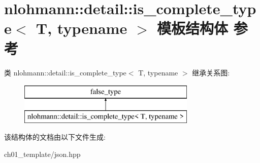 \hypertarget{structnlohmann_1_1detail_1_1is__complete__type}{}\section{nlohmann\+::detail\+::is\+\_\+complete\+\_\+type$<$ T, typename $>$ 模板结构体 参考}
\label{structnlohmann_1_1detail_1_1is__complete__type}
类 nlohmann\+::detail\+::is\+\_\+complete\+\_\+type$<$ T, typename $>$ 继承关系图\+:\begin{figure}[H]
\begin{center}
\leavevmode
\includegraphics[height=2.000000cm]{structnlohmann_1_1detail_1_1is__complete__type}
\end{center}
\end{figure}


该结构体的文档由以下文件生成\+:\begin{DoxyCompactItemize}
\item 
ch01\+\_\+template/json.\+hpp\end{DoxyCompactItemize}
